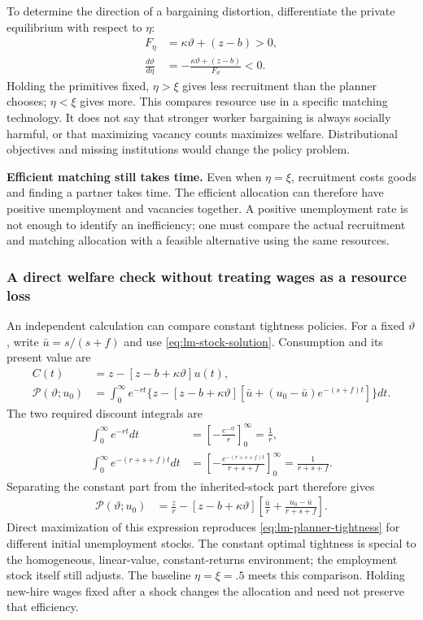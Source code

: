 To determine the direction of a bargaining distortion, differentiate the
private equilibrium with respect to $\eta$:
\begin{align}
 F_\eta&=\kappa\vartheta+(z-b)>0,\\
 \frac{d\vartheta}{d\eta}
 &=-\frac{\kappa\vartheta+(z-b)}{F_\vartheta}<0.
\end{align}
Holding the primitives fixed, $\eta>\xi$ gives less recruitment than the
planner chooses; $\eta<\xi$ gives more. This compares resource use in a
specific matching technology. It does not say that stronger worker bargaining
is always socially harmful, or that maximizing vacancy counts maximizes
welfare. Distributional objectives and missing institutions would change
the policy problem.

\begin{greenblock}
\textbf{Efficient matching still takes time.}
Even when $\eta=\xi$, recruitment costs goods and finding a partner takes time.
The efficient allocation can therefore have positive unemployment and
vacancies together. A positive unemployment rate is not enough to identify
an inefficiency; one must compare the actual recruitment and matching
allocation with a feasible alternative using the same resources.
\end{greenblock}

\subsubsection{A direct welfare check without treating wages as a resource loss}

An independent calculation can compare constant tightness policies. For a
fixed $\vartheta$, write $\bar u=s/(s+f)$ and use
\eqref{eq:lm-stock-solution}. Consumption and its present value are
\begin{align}
 C(t)&=z-[z-b+\kappa\vartheta]u(t),\\
 \mathcal P(\vartheta;u_0)
 &=\int_0^\infty e^{-rt}\{z-[z-b+\kappa\vartheta]
        [\bar u+(u_0-\bar u)e^{-(s+f)t}]\}dt.
\end{align}
The two required discount integrals are
\begin{align}
 \int_0^\infty e^{-rt}dt
 &=\left[-\frac{e^{-rt}}r\right]_0^\infty=\frac1r,\\
 \int_0^\infty e^{-(r+s+f)t}dt
 &=\left[-\frac{e^{-(r+s+f)t}}{r+s+f}\right]_0^\infty
   =\frac1{r+s+f}.
\end{align}
Separating the constant part from the inherited-stock part therefore gives
\begin{align}
 \mathcal P(\vartheta;u_0)
 &=\frac zr-[z-b+\kappa\vartheta]
       \left[\frac{\bar u}r+\frac{u_0-\bar u}{r+s+f}\right].
\end{align}
Direct maximization of this expression reproduces
\eqref{eq:lm-planner-tightness} for different initial unemployment stocks.
The constant optimal tightness is special to the homogeneous, linear-value,
constant-returns environment; the employment stock itself still adjusts.
The baseline $\eta=\xi=.5$ meets this comparison. Holding new-hire wages fixed
after a shock changes the allocation and need not preserve that efficiency.


